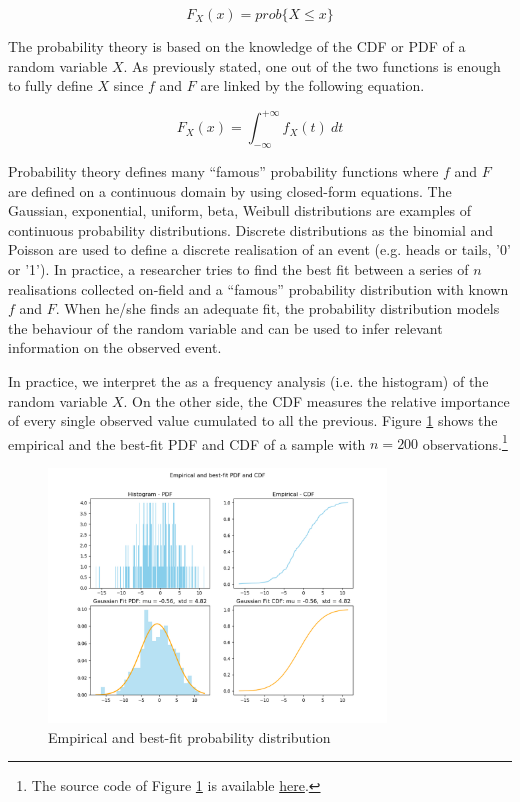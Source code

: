 \begin{equation}
F_X\left(x\right)=prob\{X\le x\}
\label{eq_cdf}
\end{equation}

The probability theory is based on the knowledge of the CDF or PDF of a random variable $X$. As previously stated, one out of the two functions is enough to fully define $X$ since $f$ and $F$ are linked by the following equation.

\begin{equation}
F_X(x)=\int_{-\infty}^{+\infty}{f_X\left(t\right)\ dt}
\label{eq_cdfIntegralPdf}
\end{equation}

Probability theory defines many “famous” probability functions where $f$ and $F$ are defined on a continuous domain by using closed-form equations. The Gaussian, exponential, uniform, beta, Weibull distributions are examples of continuous probability distributions. Discrete distributions as the binomial and Poisson are used to define a discrete realisation of an event (e.g. heads or tails, '0' or '1'). In practice, a researcher tries to find the best fit between a series of $n$ realisations collected on-field and a “famous” probability distribution with known $f$ and $F$. When he/she finds an adequate fit, the probability distribution models the behaviour of the random variable and can be used to infer relevant information on the observed event.\par

In practice, we interpret the as a frequency analysis (i.e. the histogram) of the random variable $X$. On the other side, the CDF measures the relative importance of every single observed value cumulated to all the previous. Figure \ref{fig_empiricalPdfCdf} shows the empirical and the best-fit PDF and CDF of a sample with $n=200$ observations.\footnote{The source code of Figure \ref{fig_empiricalPdfCdf} is available \href{https://github.com/aletuf93/logproj/blob/master/examples/01_elemStat/01.\%20Probability\%20Theory.ipynb}{here}.
}

\begin{figure}[hbt!]
\centering
\includegraphics[width=0.8\textwidth]{SectionLetsMath/elemStat_figures/fig_empiricalPdfCdf.png}
\captionsetup{type=figure}
\caption{Empirical and best-fit probability distribution}
\label{fig_empiricalPdfCdf}
\end{figure}

